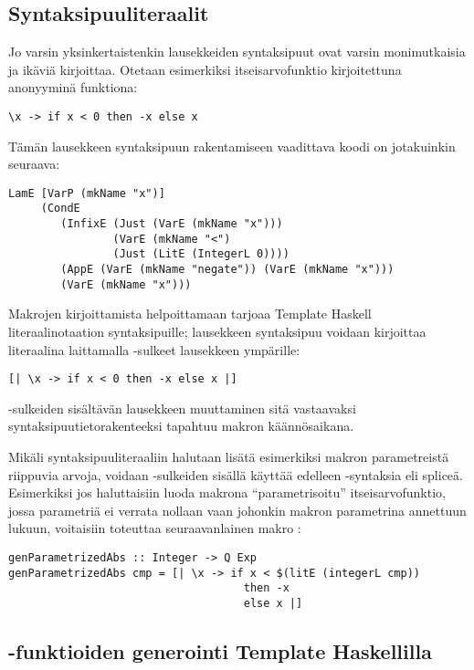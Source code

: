 \subsection{Syntaksipuuliteraalit}
Jo varsin yksinkertaistenkin lausekkeiden syntaksipuut ovat varsin monimutkaisia ja ikäviä kirjoittaa.
Otetaan esimerkiksi itseisarvofunktio kirjoitettuna anonyyminä funktiona:
\begin{verbatim}
\x -> if x < 0 then -x else x
\end{verbatim}
Tämän lausekkeen syntaksipuun rakentamiseen vaadittava koodi on jotakuinkin seuraava:
\begin{verbatim}
LamE [VarP (mkName "x")]
     (CondE
        (InfixE (Just (VarE (mkName "x")))
                (VarE (mkName "<")
                (Just (LitE (IntegerL 0))))
        (AppE (VarE (mkName "negate")) (VarE (mkName "x")))
        (VarE (mkName "x")))
\end{verbatim}
Makrojen kirjoittamista helpoittamaan tarjoaa Template Haskell literaalinotaation syntaksipuille;
lausekkeen syntaksipuu voidaan kirjoittaa literaalina laittamalla \Haskell{[| |]}-sulkeet lausekkeen ympärille:
\begin{verbatim}
[| \x -> if x < 0 then -x else x |]
\end{verbatim}
\Haskell{[| |]}-sulkeiden sisältävän lausekkeen muuttaminen sitä vastaavaksi syntaksipuutietorakenteeksi
tapahtuu makron käännösaikana.

Mikäli syntaksipuuliteraaliin halutaan lisätä esimerkiksi makron parametreistä riippuvia arvoja,
voidaan \Haskell{[| |]}-sulkeiden sisällä käyttää edelleen \Haskell{\$()}-syntaksia eli spliceä.
Esimerkiksi jos haluttaisiin luoda makrona ``parametrisoitu'' itseisarvofunktio,
jossa parametriä ei verrata nollaan vaan johonkin makron parametrina annettuun lukuun,
voitaisiin toteuttaa seuraavanlainen makro :
\begin{verbatim}
genParametrizedAbs :: Integer -> Q Exp
genParametrizedAbs cmp = [| \x -> if x < $(litE (integerL cmp))
                                    then -x
                                    else x |]
\end{verbatim}
\iffalse
$ %
\fi

\subsection{-funktioiden generointi Template Haskellilla}

